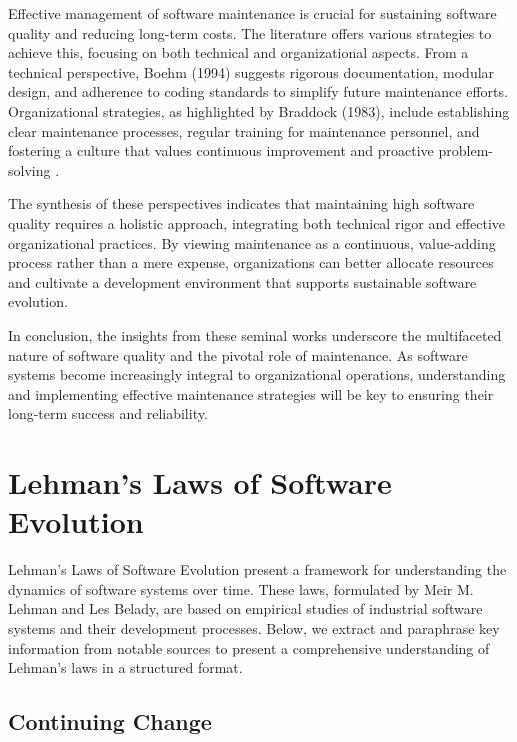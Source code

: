 Effective management of software maintenance is crucial for sustaining software quality and reducing long-term costs. The literature offers various strategies to achieve this, focusing on both technical and organizational aspects. From a technical perspective, Boehm (1994) suggests rigorous documentation, modular design, and adherence to coding standards to simplify future maintenance efforts. Organizational strategies, as highlighted by Braddock (1983), include establishing clear maintenance processes, regular training for maintenance personnel, and fostering a culture that values continuous improvement and proactive problem-solving  .

The synthesis of these perspectives indicates that maintaining high software quality requires a holistic approach, integrating both technical rigor and effective organizational practices. By viewing maintenance as a continuous, value-adding process rather than a mere expense, organizations can better allocate resources and cultivate a development environment that supports sustainable software evolution.

In conclusion, the insights from these seminal works underscore the multifaceted nature of software quality and the pivotal role of maintenance. As software systems become increasingly integral to organizational operations, understanding and implementing effective maintenance strategies will be key to ensuring their long-term success and reliability.
    


\section{Lehman’s Laws of Software Evolution}

\cite{LehmanLaws1980}
\cite{Lehman1978ProgramsCS}
\cite{Lehman1996Laws}


Lehman’s Laws of Software Evolution present a framework for understanding the dynamics of software systems over time. These laws, formulated by Meir M. Lehman and Les Belady, are based on empirical studies of industrial software systems and their development processes. Below, we extract and paraphrase key information from notable sources to present a comprehensive understanding of Lehman's laws in a structured format.

\subsection{Continuing Change}

